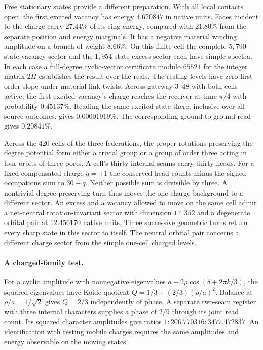 Free stationary states provide a different preparation. With all local
contacts open, the first excited vacancy has energy $4.620847$ in native
units. Faces incident to the charge carry $27.44\%$ of its ring energy,
compared with $21.80\%$ from the separate position and energy marginals.
It has a negative material winding amplitude on a branch of weight
$8.66\%$. On this finite cell the complete $5,790$-state vacancy sector
and the $1,954$-state excess sector each have simple spectra. In each
case a full-degree cyclic-vector certificate modulo $65521$ for the
integer matrix $2H$ establishes the result over the reals. The resting
levels have zero first-order slope under material link twists. Across
gateway $3$--$48$ with both cells active, the first excited vacancy's charge
reaches the receiver at time $\pi/4$ with probability $0.45137\%$.
Reading the same excited state there, inclusive over all source outcomes,
gives $0.00001919\%$. The corresponding ground-to-ground read gives
$0.20841\%$.

Across the 420 cells of the three federations, the proper rotations
preserving the degree potential form either a trivial group or a group
of order three acting in four orbits of three ports. A cell's thirty
internal seams carry thirty heads. For a fixed compensated charge
$q=\pm1$ the conserved head counts minus the signed occupations sum to
$30-q$. Neither possible sum is divisible by three. A nontrivial
degree-preserving turn thus moves the one-charge background to a different
sector. An excess and a vacancy allowed to move on the same cell admit
a net-neutral rotation-invariant sector with dimension $17,352$ and
a degenerate orbital pair at $12.456170$ native units. Three successive
geometric turns return every sharp state in this sector to itself.
The neutral orbital pair concerns a different charge sector from
the simple one-cell charged levels.

\paragraph{A charged-family test.}
For a cyclic amplitude with nonnegative eigenvalues
$a+2\rho\cos(\delta+2\pi k/3)$, the squared eigenvalues have Koide quotient
$Q=1/3+(2/3)(\rho/a)^2$. Balance at $\rho/a=1/\sqrt2$ gives $Q=2/3$
independently of phase. A separate two-seam register with three internal
characters supplies a phase of $2/9$ through its joint read count. Its
squared character amplitudes give ratios $1:206.770316:3477.472837$.
An identification with resting mobile charges requires the same amplitudes
and energy observable on the moving states.

